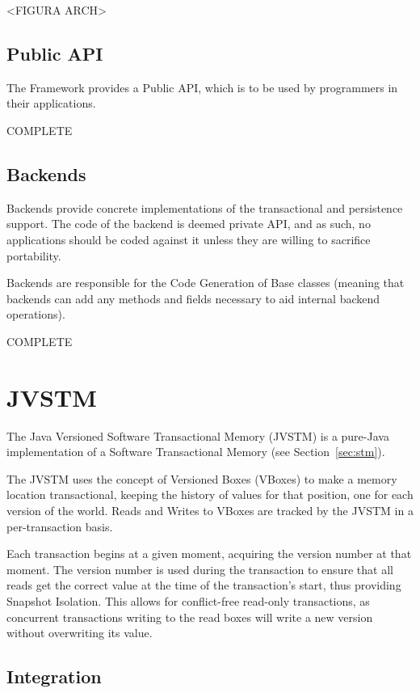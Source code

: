 <FIGURA ARCH>

\subsection{Public API}

The Framework provides a Public API, which is to be used by
programmers in their applications.

COMPLETE

\subsection{Backends}

Backends provide concrete implementations of the transactional and
persistence support. The code of the backend is deemed private API,
and as such, no applications should be coded against it unless they
are willing to sacrifice portability.

Backends are responsible for the Code Generation of Base classes
(meaning that backends can add any methods and fields necessary to aid
internal backend operations).

COMPLETE

\section{JVSTM}
\label{sec:jvstm}

The Java Versioned Software Transactional Memory (JVSTM)
\cite{cachopo2006versioned} is a pure-Java implementation of a
Software Transactional Memory (see Section~\ref{sec:stm}).

The JVSTM uses the concept of Versioned Boxes (VBoxes) to make a
memory location transactional, keeping the history of values for that
position, one for each version of the world. Reads and Writes to
VBoxes are tracked by the JVSTM in a per-transaction basis. 

Each transaction begins at a given moment, acquiring the version
number at that moment. The version number is used during the
transaction to ensure that all reads get the correct value at the time
of the transaction's start, thus providing Snapshot Isolation. This
allows for conflict-free read-only transactions, as concurrent
transactions writing to the read boxes will write a new version
without overwriting its value.

\subsection{Integration}

